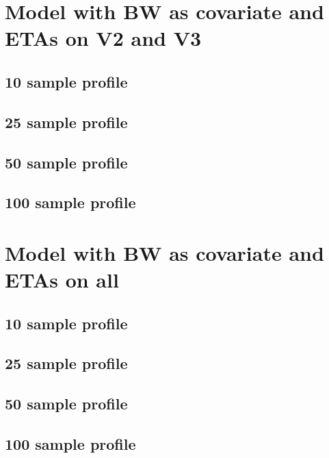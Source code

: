 \section{Model with BW as covariate and ETAs on V2 and V3}
\subsection{10 sample profile}


\subsection{25 sample profile}


\subsection{50 sample profile}


\subsection{100 sample profile}



\section{Model with BW as covariate and ETAs on all}
\subsection{10 sample profile}


\subsection{25 sample profile}


\subsection{50 sample profile}


\subsection{100 sample profile}

